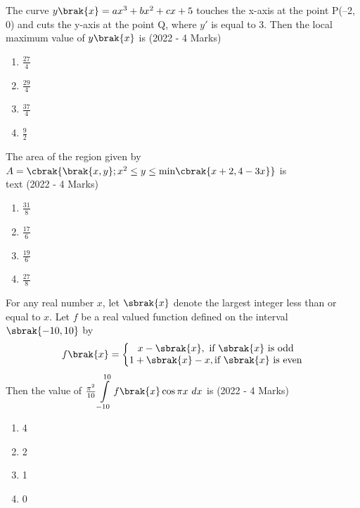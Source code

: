  	\item{
			The curve $y\brak{x} = ax^3 + bx^2 + cx + 5$ touches the x-axis at the point P(–2, 0) and cuts the y-axis at the point Q, where $y'$ is equal to 3. Then the local maximum value of $y\brak{x}$ is
			\text{ }
			\hfill
			{(2022 - 4 Marks)}
			
			\begin{multicols}{4}
				\begin{enumerate}
					\item $\frac{27}{4}$
					\item $\frac{29}{4}$
					\item $\frac{37}{4}$
					\item $\frac{9}{2}$
				\end{enumerate}
			\end{multicols}
			
		}
 	\item{
			The area of the region given by $A=\cbrak{\brak{x,y};x^2\leq y \leq \text{min}\cbrak{x+2, 4-3x}}$ is \\text{ } \hfill
			{(2022 - 4 Marks)}
			
			\begin{multicols}{2}
				\begin{enumerate}
					\item $\frac{31}{8}$
					\item $\frac{17}{6}$
					\item $\frac{19}{6}$
					\item $\frac{27}{8}$
				\end{enumerate}
			\end{multicols}
			
		}
    \item{
            For any real number $x$, let $\sbrak{x}$ denote the largest integer less than or equal to $x$. Let $f$ be a real valued function defined on the interval $\sbrak{-10, 10}$ by $$ f\brak{x}=\left\{\begin{matrix}x-\sbrak{x}, \text{ if } \sbrak{x} \text{ is odd} \\1+\sbrak{x}-x, \text{if }\sbrak{x}\text{ is even}\end{matrix}\right.$$ Then the value of $\frac{\pi^2}{10}\displaystyle\int\limits_{-10}^{10}f\brak{x}\cos\pi x\ dx$ is
             \text{ }
             \hfill
                {(2022 - 4 Marks)}
            \begin{multicols}{4}
                \begin{enumerate}
                	\item 4
                    \item 2
                    \item 1
                    \item 0
                \end{enumerate}
            \end{multicols}

        
        }
